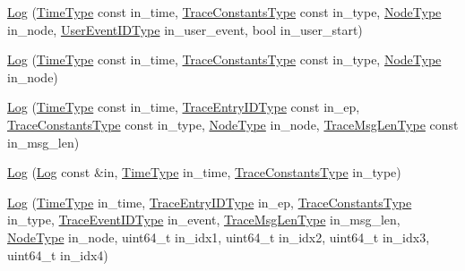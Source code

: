 \begin{DoxyCompactItemize}
\item 
\hyperlink{structvt_1_1trace_1_1_log_a76fb3e5b80eeb9d4ba7c4919a17ad580}{Log} (\hyperlink{namespacevt_a2b9f28078dc309ad0706b69ded743e69}{Time\+Type} const in\+\_\+time, \hyperlink{namespacevt_1_1trace_acf454dfbd581b0ebae895f90b5927a1d}{Trace\+Constants\+Type} const in\+\_\+type, \hyperlink{namespacevt_a866da9d0efc19c0a1ce79e9e492f47e2}{Node\+Type} in\+\_\+node, \hyperlink{namespacevt_1_1trace_a5908920d051c144c89f17c69ed262350}{User\+Event\+I\+D\+Type} in\+\_\+user\+\_\+event, bool in\+\_\+user\+\_\+start)
\item 
\hyperlink{structvt_1_1trace_1_1_log_a9126225384ac2203386748caca923b37}{Log} (\hyperlink{namespacevt_a2b9f28078dc309ad0706b69ded743e69}{Time\+Type} const in\+\_\+time, \hyperlink{namespacevt_1_1trace_acf454dfbd581b0ebae895f90b5927a1d}{Trace\+Constants\+Type} const in\+\_\+type, \hyperlink{namespacevt_a866da9d0efc19c0a1ce79e9e492f47e2}{Node\+Type} in\+\_\+node)
\item 
\hyperlink{structvt_1_1trace_1_1_log_a02609a0883e79bf1754a1ae06be3f02d}{Log} (\hyperlink{namespacevt_a2b9f28078dc309ad0706b69ded743e69}{Time\+Type} const in\+\_\+time, \hyperlink{namespacevt_1_1trace_a3c14050715ba9eceaeff51fb3de64f2f}{Trace\+Entry\+I\+D\+Type} const in\+\_\+ep, \hyperlink{namespacevt_1_1trace_acf454dfbd581b0ebae895f90b5927a1d}{Trace\+Constants\+Type} const in\+\_\+type, \hyperlink{namespacevt_a866da9d0efc19c0a1ce79e9e492f47e2}{Node\+Type} in\+\_\+node, \hyperlink{namespacevt_1_1trace_aeb598f45d67d41db7902e494f2f0ce59}{Trace\+Msg\+Len\+Type} const in\+\_\+msg\+\_\+len)
\item 
\hyperlink{structvt_1_1trace_1_1_log_a370e1e1dbbef1d938ba9d2c43404c254}{Log} (\hyperlink{structvt_1_1trace_1_1_log}{Log} const \&in, \hyperlink{namespacevt_a2b9f28078dc309ad0706b69ded743e69}{Time\+Type} in\+\_\+time, \hyperlink{namespacevt_1_1trace_acf454dfbd581b0ebae895f90b5927a1d}{Trace\+Constants\+Type} in\+\_\+type)
\item 
\hyperlink{structvt_1_1trace_1_1_log_a33567f4e9e5c0632322e20b30b28d758}{Log} (\hyperlink{namespacevt_a2b9f28078dc309ad0706b69ded743e69}{Time\+Type} in\+\_\+time, \hyperlink{namespacevt_1_1trace_a3c14050715ba9eceaeff51fb3de64f2f}{Trace\+Entry\+I\+D\+Type} in\+\_\+ep, \hyperlink{namespacevt_1_1trace_acf454dfbd581b0ebae895f90b5927a1d}{Trace\+Constants\+Type} in\+\_\+type, \hyperlink{namespacevt_1_1trace_a64a7185f3e102df8d8258f263ccd1582}{Trace\+Event\+I\+D\+Type} in\+\_\+event, \hyperlink{namespacevt_1_1trace_aeb598f45d67d41db7902e494f2f0ce59}{Trace\+Msg\+Len\+Type} in\+\_\+msg\+\_\+len, \hyperlink{namespacevt_a866da9d0efc19c0a1ce79e9e492f47e2}{Node\+Type} in\+\_\+node, uint64\+\_\+t in\+\_\+idx1, uint64\+\_\+t in\+\_\+idx2, uint64\+\_\+t in\+\_\+idx3, uint64\+\_\+t in\+\_\+idx4)

\end{DoxyCompactItemize}
